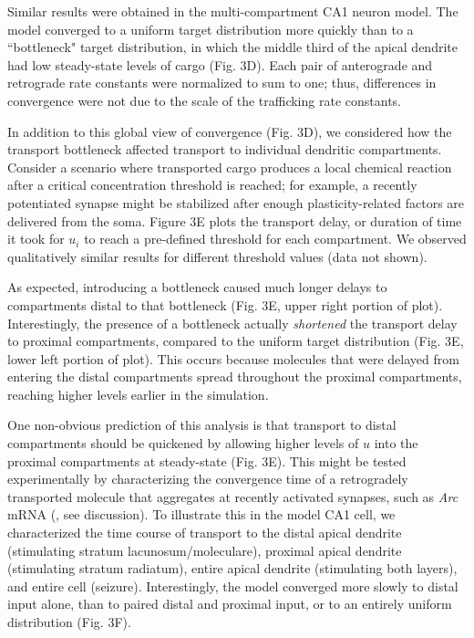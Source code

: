 \documentclass[fleqn,10pt]{wlpeerj}
\begin{document}
Similar results were obtained in the multi-compartment CA1 neuron model. The model converged to a uniform target distribution more quickly than to a ``bottleneck" target distribution, in which the middle third of the apical dendrite had low steady-state levels of cargo (Fig. 3D). Each pair of anterograde and retrograde rate constants were normalized to sum to one; thus, differences in convergence were not due to the scale of the trafficking rate constants.

In addition to this global view of convergence (Fig. 3D), we considered how the transport bottleneck affected transport to individual dendritic compartments. Consider a scenario where transported cargo produces a local chemical reaction after a critical concentration threshold is reached; for example, a recently potentiated synapse might be stabilized after enough plasticity-related factors are delivered from the soma. Figure 3E plots the transport delay, or duration of time it took for $u_i$ to reach a pre-defined threshold for each compartment. We observed qualitatively similar results for different threshold values (data not shown).

As expected, introducing a bottleneck caused much longer delays to compartments distal to that bottleneck (Fig. 3E, upper right portion of plot). Interestingly, the presence of a bottleneck actually \textit{shortened} the transport delay to proximal compartments, compared to the uniform target distribution (Fig. 3E, lower left portion of plot). This occurs because molecules that were delayed from entering the distal compartments spread throughout the proximal compartments, reaching higher levels earlier in the simulation.

One non-obvious prediction of this analysis is that transport to distal compartments should be quickened by allowing higher levels of $u$ into the proximal compartments at steady-state (Fig. 3E). This might be tested experimentally by characterizing the convergence time of a retrogradely transported molecule that aggregates at recently activated synapses, such as \textit{Arc} mRNA (\citet{Steward_1998}, see discussion). To illustrate this in the model CA1 cell, we characterized the time course of transport to the distal apical dendrite (stimulating stratum lacunosum/moleculare), proximal apical dendrite (stimulating stratum radiatum), entire apical dendrite (stimulating both layers), and entire cell (seizure). Interestingly, the model converged more slowly to distal input alone, than to paired distal and proximal input, or to an entirely uniform distribution (Fig. 3F).
\end{document}
